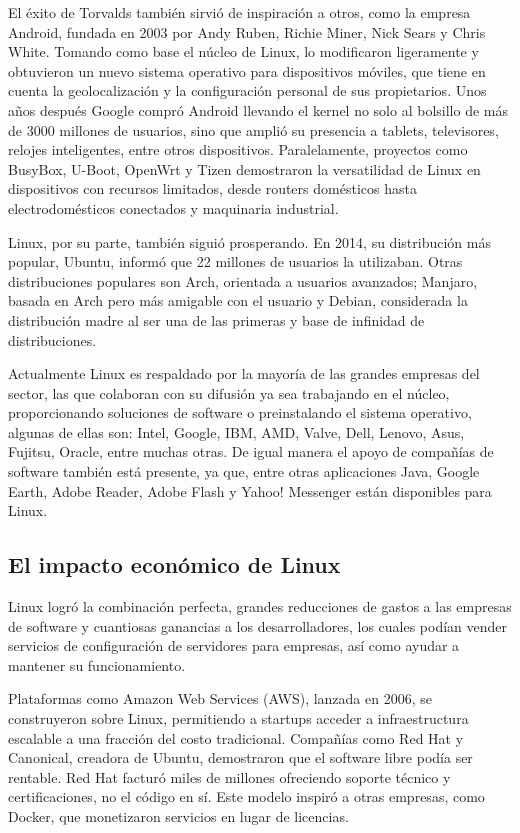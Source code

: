 \documentclass[a4paper,12pt]{article}
\begin{document}
El éxito de Torvalds también sirvió de inspiración a otros, como la empresa Android, fundada 
en 2003 por Andy Ruben, Richie Miner, Nick Sears y Chris White. Tomando como base el núcleo de Linux, 
lo modificaron ligeramente y obtuvieron un nuevo sistema operativo para dispositivos móviles, 
que tiene en cuenta la geolocalización y la configuración personal de sus propietarios. Unos años 
después Google compró Android llevando el kernel no solo al bolsillo de más de 3000 millones de 
usuarios, sino que amplió su presencia a tablets, televisores, relojes inteligentes, entre otros 
dispositivos. Paralelamente, proyectos como BusyBox, U-Boot, OpenWrt y Tizen demostraron la 
versatilidad de Linux en dispositivos con recursos limitados, desde routers domésticos hasta 
electrodomésticos conectados y maquinaria industrial.

Linux, por su parte, también siguió prosperando. En 2014, su distribución más popular, Ubuntu, informó 
que 22 millones de usuarios la utilizaban. Otras distribuciones populares son Arch, orientada a usuarios 
avanzados; Manjaro, basada en Arch pero más amigable con el usuario y Debian, considerada la 
distribución madre al ser una de las primeras y base de infinidad de distribuciones. 

Actualmente Linux es respaldado por la mayoría de las grandes empresas del sector, las que colaboran 
con su difusión ya sea trabajando en el núcleo, proporcionando soluciones de software o 
preinstalando el sistema operativo, algunas de ellas son: Intel, Google, IBM, AMD, Valve, Dell, Lenovo, 
Asus, Fujitsu, Oracle, entre muchas otras. De igual manera el apoyo de compañías de software también 
está presente, ya que, entre otras aplicaciones Java, Google Earth, Adobe Reader, Adobe Flash y Yahoo! Messenger 
están disponibles para Linux. 
\subsection{El impacto económico de Linux}

Linux logró la combinación perfecta, grandes reducciones de gastos a las empresas de software y cuantiosas 
ganancias a los desarrolladores, los cuales podían vender servicios de configuración de servidores 
para empresas, así como ayudar a mantener su funcionamiento. 

Plataformas como Amazon Web Services (AWS), lanzada en 2006, se construyeron sobre Linux, permitiendo a 
startups acceder a infraestructura escalable a una fracción del costo tradicional. Compañías como Red Hat y 
Canonical, creadora de Ubuntu, demostraron que el software libre podía ser rentable. Red Hat facturó miles 
de millones ofreciendo soporte técnico y certificaciones, no el código en sí. Este modelo inspiró a otras 
empresas, como Docker, que monetizaron servicios en lugar de licencias.
\end{document}
